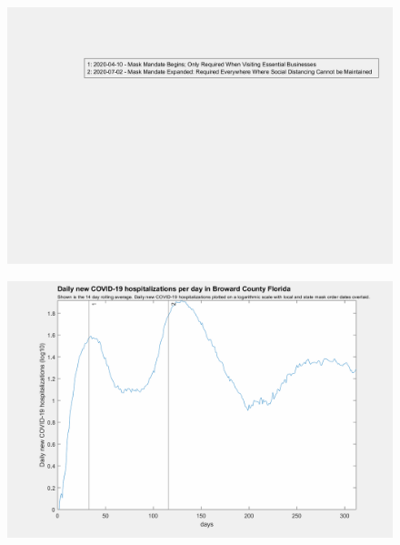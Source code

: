 \documentclass[]{article}
\begin{document}
\begin{figure}[!h]
	\includegraphics[width=\linewidth]{legends/broward_mask_order_legend.png}
	\caption{}
	\label{fig:legends/broward_mask_order_legendLabel}
\end{figure}

\begin{figure}[!h]
	\includegraphics[width=\linewidth]{images/broward_mask_order_hospitalizations_log.png}
	\caption{}
	\label{fig:images/broward_mask_order_hospitalizations_logLabel}
\end{figure}
\end{document}
